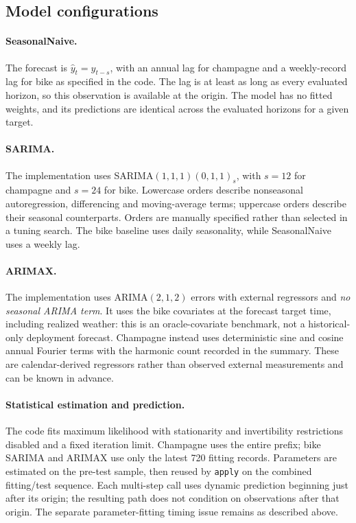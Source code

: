 \documentclass[10pt,a4paper]{article}
\begin{document}
\subsection{Model configurations}
\paragraph{SeasonalNaive.} The forecast is $\hat y_t=y_{t-s}$, with an annual lag for champagne and a weekly-record lag for bike as specified in the code. The lag is at least as long as every evaluated horizon, so this observation is available at the origin. The model has no fitted weights, and its predictions are identical across the evaluated horizons for a given target.

\paragraph{SARIMA.} The implementation uses SARIMA$(1,1,1)(0,1,1)_s$, with $s=12$ for champagne and $s=24$ for bike. Lowercase orders describe nonseasonal autoregression, differencing and moving-average terms; uppercase orders describe their seasonal counterparts. Orders are manually specified rather than selected in a tuning search. The bike baseline uses daily seasonality, while SeasonalNaive uses a weekly lag.

\paragraph{ARIMAX.} The implementation uses ARIMA$(2,1,2)$ errors with external regressors and \emph{no seasonal ARIMA term}. It uses the bike covariates at the forecast target time, including realized weather: this is an oracle-covariate benchmark, not a historical-only deployment forecast. Champagne instead uses deterministic sine and cosine annual Fourier terms with the harmonic count recorded in the summary. These are calendar-derived regressors rather than observed external measurements and can be known in advance.

\paragraph{Statistical estimation and prediction.} The code fits maximum likelihood with stationarity and invertibility restrictions disabled and a fixed iteration limit. Champagne uses the entire prefix; bike SARIMA and ARIMAX use only the latest 720 fitting records. Parameters are estimated on the pre-test sample, then reused by \texttt{apply} on the combined fitting/test sequence. Each multi-step call uses dynamic prediction beginning just after its origin; the resulting path does not condition on observations after that origin. The separate parameter-fitting timing issue remains as described above.
\end{document}

